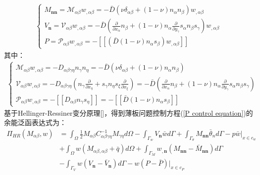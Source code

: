 \begin{equation}
\begin{split}\label{MVP}
    \begin{cases}
        M_{\pmb{nn}}=\mathcal{M}_{\alpha\beta}w_{,\alpha\beta}=-\bar{D}(\nu\delta_{\alpha\beta}+(1-\nu)n_{\alpha}n_{\beta})w_{,\alpha\beta}\\
        V_{\pmb{n}}=\mathcal{V}_{\alpha\beta}w_{,\alpha\beta}=-\bar{D}(\frac{\partial}{\partial x_{\alpha}}n_{\beta}+(1-\nu)n_{\alpha}\frac{\partial}{\partial y_{\gamma}}s_{\alpha}n_{\beta}s_{\gamma})w_{,\alpha\beta}\\
        P=\mathcal{P}_{\alpha\beta}w_{,\alpha\beta}=-[[(\bar{D}(1-\nu)n_{\alpha}s_{\beta})w_{,\alpha\beta}]]
    \end{cases}
\end{split}
\end{equation}
其中：
\begin{equation}
\begin{split}\label{MVP1}
    \begin{cases}
 \mathcal{M}_{\alpha\beta}w_{,\alpha\beta}=-D_{\alpha\beta\gamma\eta}n_{\gamma}n_{\eta}=-\bar{D}(\nu\delta_{\alpha\beta}+(1-\nu)n_{\alpha}n_{\beta})\\
  \mathcal{V}_{\alpha\beta}w_{,\alpha\beta}=-D_{\alpha\beta\gamma\eta}(n_{\gamma}\frac{\partial}{\partial x_{\eta}}+s_{\gamma}n_{\eta}s_{\xi}\frac{\partial}{\partial x_{\xi}})=-\bar{D}(\frac{\partial}{\partial x_{\alpha}}n_{\beta}+(1-\nu)n_{\alpha}\frac{\partial}{\partial y_{\gamma}}s_{\alpha}n_{\beta}s_{\gamma})\\
 \mathcal{P}_{\alpha\beta}w_{,\alpha\beta}=-[[D_{\alpha\beta}n_{\gamma}s_{\eta}]]=-[[\bar{D}(1-\nu)n_{\alpha}s_{\beta}]]
    \end{cases}
\end{split}
\end{equation}
基于Hellinger-Ressiner变分原理[]，得到薄板问题控制方程(\ref{P control equation})的余能泛函表达式为：
\begin{equation}\label{pfanhan}
\begin{split}
    \Pi_{H\!R}(M_{\alpha\beta},w)&=\int_{\Omega}\frac{1}{2}M_{\alpha\beta}C^{-1}_{\alpha\beta\gamma\eta}M_{\gamma\eta}d\Omega-\int_{\Gamma_w}V_{\pmb n}\bar{w}d\Gamma+\int_{\Gamma_{\theta}}M_{\pmb{nn}}\bar{\theta}_nd\Gamma-p\bar{w}\vert_{x\in{c_w}}\\
&+\int_{\Omega}w(M_{\alpha\beta,\alpha\beta}+\bar{q})d\Omega+\int_{\Gamma_M}w_{,\pmb n}(M_{\pmb{nn}}-\bar{M}_{\pmb{nn}})d\Gamma\\
&-\int_{\Gamma_V}w(V_{\pmb n}-\bar{V}_{\pmb n})d\Gamma-w(P-\bar{P})\vert_{x\in{c_P}}
\end{split}
\end{equation}
